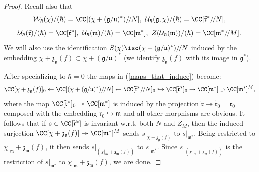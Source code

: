 \documentclass[12pt]{amsart}
\begin{document}
\begin{proof}
 Recall also that 
 \begin{equation*}
 \mathcal{W}_{\hbar}(\chi)/(\hbar) = \CC[(\chi+(\mathfrak{g}/\mathfrak{u})^*)/\!/N],~\mathcal{U}_{\hbar}(\mathfrak{g},\chi)/(\hbar) = \CC[\widetilde{\mathfrak{r}}^*/\!/N],
 \end{equation*}
 \begin{equation*}
\mathcal{U}_\hbar(\widetilde{\mathfrak{r}})/(\hbar)=\CC[\widetilde{\mathfrak{r}}^*],~\mathcal{U}_{\hbar}(\mathfrak{m})/(\hbar)=\CC[\mathfrak{m}^*],~Z(\mathcal{U}_{\hbar}(\mathfrak{m}))/(\hbar)=\CC[\mathfrak{m}^*/\!/M].
\end{equation*} 
We will also use the identification $S(\chi) \iso (\chi+(\mathfrak{g}/\mathfrak{u})^*)/\!/N$ induced by the embedding $\chi+\mathfrak{z}_{\mathfrak{g}}(f) \subset \chi+(\mathfrak{g}/\mathfrak{u})^*$ (we identify $\mathfrak{z}_{\mathfrak{g}}(f)$ with its image in $\mathfrak{g}^*$).


After specializing to $\hbar=0$ the maps in (\ref{maps_that_induce})  become:
\begin{equation*}
\CC[\chi+\mathfrak{z}_{\mathfrak{g}}(f)]_0 \leftarrow \CC[(\chi+(\mathfrak{g}/\mathfrak{u})^*)/\!/N] \leftarrow \CC[\widetilde{\mathfrak{r}}^*/\!/N]_0 \hookrightarrow \CC[\widetilde{\mathfrak{r}}^*]_0 \rightarrow \CC[\mathfrak{m}^*] \supset \CC[\mathfrak{m}^*]^M, 
\end{equation*}
where the map $\CC[\widetilde{\mathfrak{r}}^*]_0 \twoheadrightarrow \CC[\mathfrak{m}^*]$ is induced by the projection $\widetilde{\mathfrak{r}} \twoheadrightarrow \widetilde{\mathfrak{r}}_0=\mathfrak{r}_0$ composed with the embedding $\mathfrak{r}_0 \hookrightarrow \mathfrak{m}$ and all other morphisms are obvious.
It follows that if $s \in \CC[\widetilde{\mathfrak{r}}^*]$ is invariant w.r.t. both $N$ and $Z_M$, then the induced surjection $\CC[\chi + \mathfrak{z}_{\mathfrak{g}}(f)] \twoheadrightarrow \CC[\mathfrak{m}^*]^M$ sends $s|_{\chi + \mathfrak{z}_{\mathfrak{g}}(f)}$ to $s|_{\mathfrak{m}^*}$. Being restricted to $\chi|_{\mathfrak{m}} + \mathfrak{z}_{\mathfrak{m}}(f)$, it then sends $s|_{(\chi|_{\mathfrak{m}} + \mathfrak{z}_{\mathfrak{m}}(f))}$ to $s|_{\mathfrak{m}^*}$. Since $s|_{(\chi|_{\mathfrak{m}} + \mathfrak{z}_{\mathfrak{m}}(f))}$ is the restriction of $s|_{\mathfrak{m}^*}$ to $\chi|_{\mathfrak{m}} + \mathfrak{z}_{\mathfrak{m}}(f)$, we are done.
\end{proof}
\end{document}
